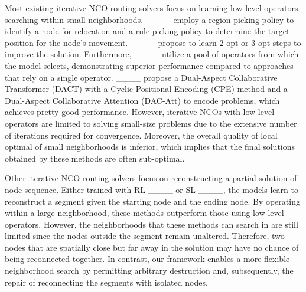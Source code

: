 Most existing iterative NCO routing solvers focus on learning low-level operators searching within small neighborhoods. ____ employ a region-picking policy to identify a node for relocation and a rule-picking policy to determine the target position for the node's movement. ____ propose to learn 2-opt or 3-opt steps to improve the solution. Furthermore, ____ utilize a pool of operators from which the model selects, demonstrating superior performance compared to approaches that rely on a single operator. ____ propose a Dual-Aspect Collaborative Transformer (DACT) with a Cyclic Positional Encoding (CPE) method and a Dual-Aspect Collaborative Attention (DAC-Att) to encode problems, which achieves pretty good performance. However, iterative NCOs with low-level operators are limited to solving small-size problems due to the extensive number of iterations required for convergence. Moreover, the overall quality of local optimal of small neighborhoods is inferior, which implies that the final solutions obtained by these methods are often sub-optimal. 


Other iterative NCO routing solvers focus on reconstructing a partial solution of node sequence. Either trained with RL ____ or SL ____, the models learn to reconstruct a segment given the starting node and the ending node. By operating within a large neighborhood, these methods outperform those using low-level operators. However, the neighborhoods that these methods can search in are still limited since the nodes outside the segment remain unaltered. Therefore, two nodes that are spatially close but far away in the solution may have no chance of being reconnected together. In contrast, our framework enables a more flexible neighborhood search by permitting arbitrary destruction and, subsequently, the repair of reconnecting the segments with isolated nodes.
